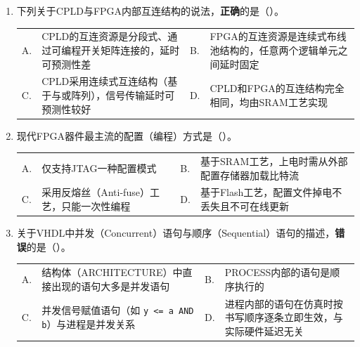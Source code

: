 \begin{enumerate}[label=\arabic*.]

\item 下列关于CPLD与FPGA内部互连结构的说法，\textbf{正确}的是（\quad）。

\vspace{0.3cm}

\begin{tabular}{@{}lp{}@{\qquad}lp{}@{}}
A. & CPLD的互连资源是分段式、通过可编程开关矩阵连接的，延时可预测性差 &
B. & FPGA的互连资源是连续式布线池结构的，任意两个逻辑单元之间延时固定 \\
C. & CPLD采用连续式互连结构（基于与或阵列），信号传输延时可预测性较好 &
D. & CPLD和FPGA的互连结构完全相同，均由SRAM工艺实现 \\
\end{tabular}

\vspace{0.8cm}

\item 现代FPGA器件最主流的配置（编程）方式是（\quad）。

\vspace{0.3cm}

\begin{tabular}{@{}lp{}@{\qquad}lp{}@{}}
A. & 仅支持JTAG一种配置模式 &
B. & 基于SRAM工艺，上电时需从外部配置存储器加载比特流 \\
C. & 采用反熔丝（Anti-fuse）工艺，只能一次性编程 &
D. & 基于Flash工艺，配置文件掉电不丢失且不可在线更新 \\
\end{tabular}

\vspace{0.8cm}

\item 关于VHDL中并发（Concurrent）语句与顺序（Sequential）语句的描述，\textbf{错误}的是（\quad）。

\vspace{0.3cm}

\begin{tabular}{@{}lp{}@{\qquad}lp{}@{}}
A. & 结构体（ARCHITECTURE）中直接出现的语句大多是并发语句 &
B. & PROCESS内部的语句是顺序执行的 \\
C. & 并发信号赋值语句（如 \texttt{y <= a AND b}）与进程是并发关系 &
D. & 进程内部的语句在仿真时按书写顺序逐条立即生效，与实际硬件延迟无关 \\
\end{tabular}


\end{enumerate}
